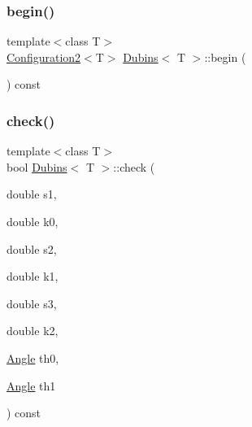 \subsubsection{\texorpdfstring{begin()}{begin()}}
{\footnotesize\ttfamily template$<$class T$>$ \\
\mbox{\hyperlink{class_configuration2}{Configuration2}}$<$T$>$ \mbox{\hyperlink{class_dubins}{Dubins}}$<$ T $>$\+::begin (\begin{DoxyParamCaption}{ }\end{DoxyParamCaption}) const\hspace{0.3cm}{\ttfamily [inline]}}

\mbox{\label{class_dubins_ae016db7e7b4c450c0281792608205449}} 
\subsubsection{\texorpdfstring{check()}{check()}}
{\footnotesize\ttfamily template$<$class T$>$ \\
bool \mbox{\hyperlink{class_dubins}{Dubins}}$<$ T $>$\+::check (\begin{DoxyParamCaption}\item[{double}]{s1,  }\item[{double}]{k0,  }\item[{double}]{s2,  }\item[{double}]{k1,  }\item[{double}]{s3,  }\item[{double}]{k2,  }\item[{\mbox{\hyperlink{class_angle}{Angle}}}]{th0,  }\item[{\mbox{\hyperlink{class_angle}{Angle}}}]{th1 }\end{DoxyParamCaption}) const\hspace{0.3cm}{\ttfamily [inline]}}

